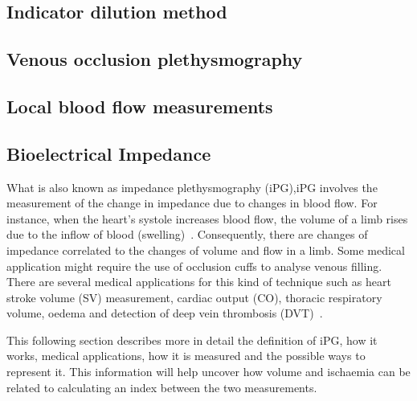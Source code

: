 \subsection{Indicator dilution method}
\label{section literature dilution}

\subsection{Venous occlusion plethysmography}
\label{section literature VOP}

\subsection{Local blood flow measurements}
\label{section literature flow}


\subsection{Bioelectrical Impedance}
\label{section literature 3.5}
What is also known as impedance plethysmography (iPG),iPG involves the measurement of the change in impedance due to changes in blood flow. For instance, when the heart’s systole increases blood flow, the volume of a limb rises due to the inflow of blood (swelling)~\cite{martinsen2011bioimpedance}. Consequently, there are changes of impedance correlated to the changes of volume and flow in a limb. Some medical application might require the use of occlusion cuffs to analyse venous filling. There are several medical applications for this kind of technique such as heart stroke volume (SV) measurement, cardiac output (CO), thoracic respiratory volume, oedema and detection of deep vein thrombosis (DVT)~\cite{holohan1996plethysmography}.

This following section describes more in detail the definition of iPG, how it works, medical applications, how it is measured and the possible ways to represent it. This information will help uncover how volume and ischaemia can be related to calculating an index between the two measurements.



